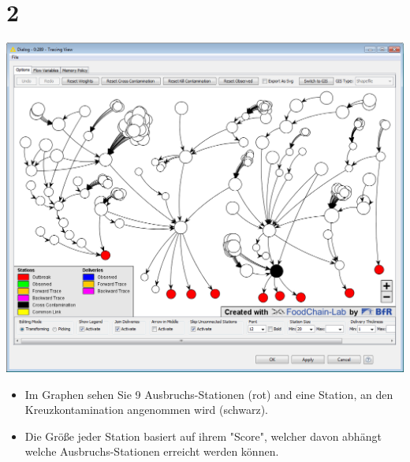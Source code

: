 \documentclass{beamer}
\begin{document}
\section{2}
\begin{frame}
	\begin{center}
  		\includegraphics[height=0.6\textheight]{2.png}
	\end{center}
	\begin{itemize}
		\item Im Graphen sehen Sie 9 Ausbruchs-Stationen (rot) and eine Station, an den Kreuzkontamination angenommen wird (schwarz).
		\item Die Größe jeder Station basiert auf ihrem "Score", welcher davon abhängt welche Ausbruchs-Stationen erreicht werden können.
	\end{itemize}
\end{frame}
\end{document}
